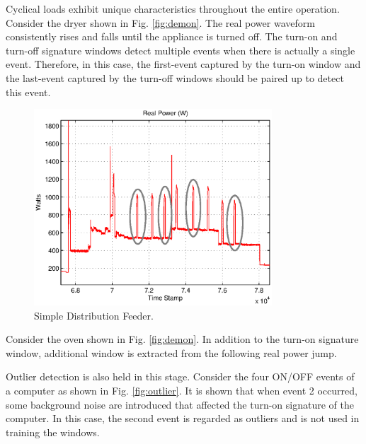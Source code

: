 \documentclass[conference]{IEEEtran}
\begin{document}
	Cyclical loads exhibit unique characteristics throughout the entire operation.  Consider the dryer shown in Fig. \ref{fig:demon}.  The real power waveform consistently rises and falls until the appliance is turned off.  The turn-on and turn-off signature windows detect multiple events when there is actually a single event.  Therefore, in this case, the first-event captured by the turn-on window and the last-event captured by the turn-off windows should be paired up to detect this event.
	
	\begin{figure}[!t]
		\centering
		\includegraphics[width=3.5in]{fig/dryerH2.eps}
		\caption{Simple Distribution Feeder.}
		\label{fig:windowlength}
	\end{figure}
	Consider the oven shown in Fig. \ref{fig:demon}.  In addition to the turn-on signature window, 
	additional window is extracted from the following real power jump.  
	
	
	
	
	Outlier detection is also held in this stage.  Consider the four ON/OFF events of a computer as shown in Fig. \ref{fig:outlier}.  It is shown that when event 2 occurred, some background noise are introduced that affected the turn-on signature of the computer.  In this case, the second event is regarded as outliers and is not used in training the windows.
	
\end{document}
